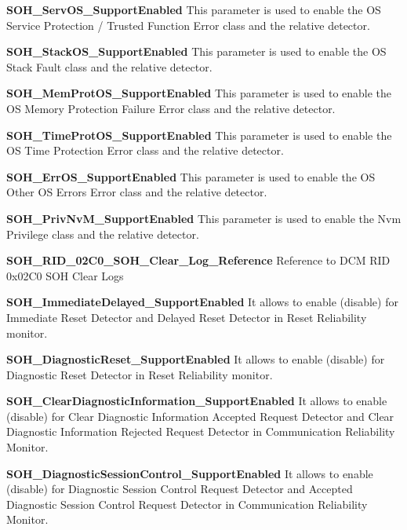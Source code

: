 \textbf{SOH\_ServOS\_SupportEnabled}\newline
This parameter is used to enable the OS Service Protection / Trusted Function Error class and the relative detector.

\textbf{SOH\_StackOS\_SupportEnabled}\newline
This parameter is used to enable the OS Stack Fault class and the relative detector.

\textbf{SOH\_MemProtOS\_SupportEnabled}\newline
This parameter is used to enable the OS Memory Protection Failure Error class and the relative detector.

\textbf{SOH\_TimeProtOS\_SupportEnabled}\newline
This parameter is used to enable the OS Time Protection Error class and the relative detector.

\textbf{SOH\_ErrOS\_SupportEnabled}\newline
This parameter is used to enable the OS Other OS Errors Error class and the relative detector.

\textbf{SOH\_PrivNvM\_SupportEnabled }\newline
This parameter is used to enable the Nvm Privilege class and the relative detector.

\textbf{SOH\_RID\_02C0\_SOH\_Clear\_Log\_Reference}
Reference to DCM RID 0x02C0 SOH Clear Logs 

\textbf{SOH\_ImmediateDelayed\_SupportEnabled}\newline
It allows to enable (disable) for Immediate Reset Detector and Delayed Reset Detector in Reset Reliability monitor.

\textbf{SOH\_DiagnosticReset\_SupportEnabled}\newline
It allows to enable (disable) for Diagnostic Reset Detector in Reset Reliability monitor. 

\textbf{SOH\_ClearDiagnosticInformation\_SupportEnabled}\newline
It allows to enable (disable) for Clear Diagnostic Information Accepted Request Detector and Clear Diagnostic Information Rejected Request Detector in Communication Reliability Monitor.

\textbf{SOH\_DiagnosticSessionControl\_SupportEnabled}\newline
It allows to enable (disable) for Diagnostic Session Control Request Detector and Accepted Diagnostic Session Control Request Detector in Communication Reliability Monitor.

